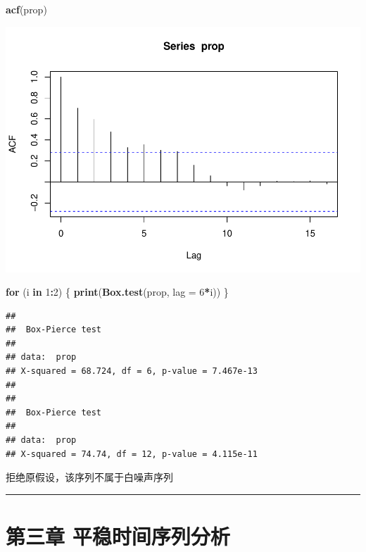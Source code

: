 \documentclass[]{article}
\newenvironment{Shaded}{\begin{snugshade}}{\end{snugshade}}
\newcommand{\ControlFlowTok}[1]{\textcolor[rgb]{0.13,0.29,0.53}{\textbf{#1}}}
\newcommand{\DataTypeTok}[1]{\textcolor[rgb]{0.13,0.29,0.53}{#1}}
\newcommand{\DecValTok}[1]{\textcolor[rgb]{0.00,0.00,0.81}{#1}}
\newcommand{\KeywordTok}[1]{\textcolor[rgb]{0.13,0.29,0.53}{\textbf{#1}}}
\newcommand{\NormalTok}[1]{#1}
\newcommand{\OperatorTok}[1]{\textcolor[rgb]{0.81,0.36,0.00}{\textbf{#1}}}
\begin{document}
\begin{Shaded}
\begin{Highlighting}[]
\KeywordTok{acf}\NormalTok{(prop)}
\end{Highlighting}
\end{Shaded}

\includegraphics{timeseries_files/figure-latex/ex2.5-2.pdf}

\begin{Shaded}
\begin{Highlighting}[]
\ControlFlowTok{for}\NormalTok{ (i }\ControlFlowTok{in} \DecValTok{1}\OperatorTok{:}\DecValTok{2}\NormalTok{) \{}
  \KeywordTok{print}\NormalTok{(}\KeywordTok{Box.test}\NormalTok{(prop, }\DataTypeTok{lag =} \DecValTok{6}\OperatorTok{*}\NormalTok{i))}
\NormalTok{\}}
\end{Highlighting}
\end{Shaded}

\begin{verbatim}
## 
##  Box-Pierce test
## 
## data:  prop
## X-squared = 68.724, df = 6, p-value = 7.467e-13
## 
## 
##  Box-Pierce test
## 
## data:  prop
## X-squared = 74.74, df = 12, p-value = 4.115e-11
\end{verbatim}

拒绝原假设，该序列不属于白噪声序列

\begin{center}\rule{0.5\linewidth}{\linethickness}\end{center}

\hypertarget{ux7b2cux4e09ux7ae0-ux5e73ux7a33ux65f6ux95f4ux5e8fux5217ux5206ux6790}{%
\section{第三章
平稳时间序列分析}\label{ux7b2cux4e09ux7ae0-ux5e73ux7a33ux65f6ux95f4ux5e8fux5217ux5206ux6790}}
\end{document}
